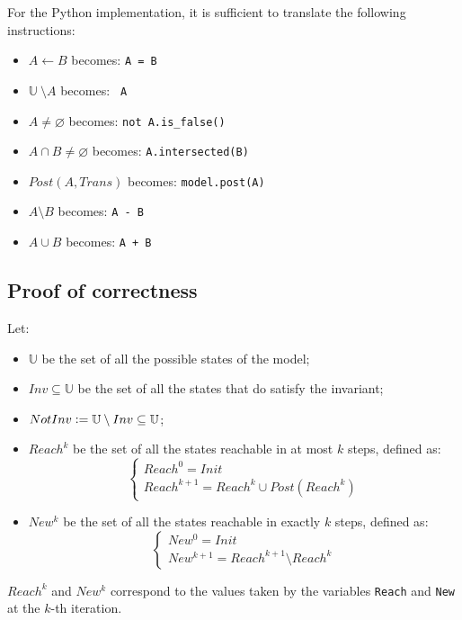\documentclass[12pt]{article}
\begin{document}
    For the Python implementation, it is sufficient to translate the following instructions:
    \begin{itemize}
        \item $A \leftarrow B$ becomes: \texttt{A = B}
        \item $\mathbb U\ \setminus A$ becomes: \texttt{~A}
        \item $A \neq \varnothing$ becomes: \texttt{not A.is_false()}
        \item $A \cap B \neq \varnothing$ becomes: \texttt{A.intersected(B)}
        \item $Post(A, Trans)$ becomes: \texttt{model.post(A)}
        \item $A \setminus B$ becomes: \texttt{A - B}
        \item $A \cup B$ becomes: \texttt{A + B}
    \end{itemize}

    \subsection{Proof of correctness}
    Let:
    \begin{itemize}
        \item $\mathbb U$ be the set of all the possible states of the model;
        \item $Inv \subseteq \mathbb U$ be the set of all the states that do satisfy the invariant;
        \item $NotInv \vcentcolon= \mathbb U \setminus Inv \subseteq \mathbb U$;
        \item $Reach^k$ be the set of all the states reachable in at most $k$ steps, defined as:
        $$
            \begin{cases}
                Reach^0 = Init \\
                Reach^{k + 1} = Reach^k \cup Post(Reach^k)
            \end{cases}
        $$
        \item $New^k$ be the set of all the states reachable in exactly $k$ steps, defined as:
        $$
            \begin{cases}
                New^0 = Init \\
                New^{k + 1} = Reach^{k+1} \setminus Reach^k
            \end{cases}
        $$
    \end{itemize}
    $Reach^k$ and $New^k$ correspond to the values taken by the variables \texttt{Reach} and \texttt{New} at the $k$-th iteration.
\end{document}
